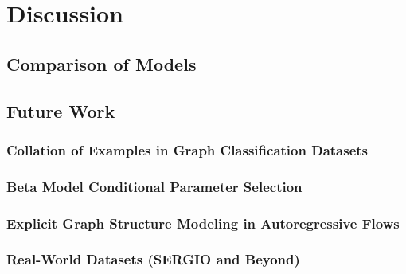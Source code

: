 \section{Discussion}

\subsection{Comparison of Models}

\subsection{Future Work}
\subsubsection{Collation of Examples in Graph Classification Datasets}

\subsubsection{Beta Model Conditional Parameter Selection}

\subsubsection{Explicit Graph Structure Modeling in Autoregressive Flows}

\subsubsection{Real-World Datasets (SERGIO and Beyond)}

\newpage
